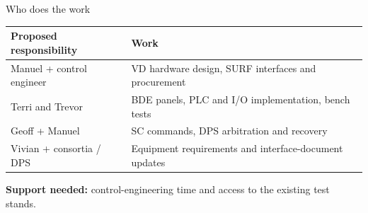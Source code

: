 \documentclass[aspectratio=169,11pt]{beamer}
\begin{document}
\begin{frame}{Who does the work}
\renewcommand{\arraystretch}{1.45}
\begin{tabularx}{\textwidth}{@{}>{\RaggedRight\arraybackslash}p{4.1cm}>{\RaggedRight\arraybackslash}X@{}}
\toprule
\textbf{Proposed responsibility} & \textbf{Work}\\\midrule
Manuel + control engineer & VD hardware design, SURF interfaces and procurement\\
Terri and Trevor & BDE panels, PLC and I/O implementation, bench tests\\
Geoff + Manuel & SC commands, DPS arbitration and recovery\\
Vivian + consortia / DPS & Equipment requirements and interface-document updates\\
\bottomrule
\end{tabularx}\par\bigskip
\textbf{Support needed:} control-engineering time and access to the existing test stands.
\end{frame}

\appendix

\end{document}
